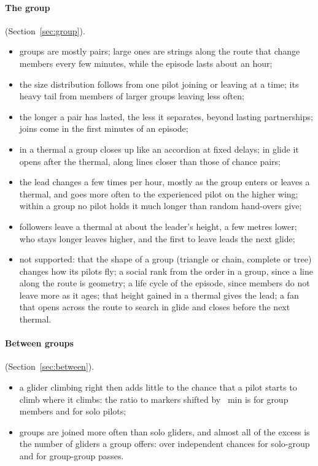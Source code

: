 \paragraph{The group} (Section~\ref{sec:group}).
\begin{itemize}
  \item groups are mostly pairs; large ones are strings along the route that change members every
        few minutes, while the episode lasts about an hour;
  \item the size distribution follows from one pilot joining or leaving at a time; its heavy tail
        from members of larger groups leaving less often;
  \item the longer a pair has lasted, the less it separates, beyond lasting partnerships; joins
        come in the first minutes of an episode;
  \item in a thermal a group closes up like an accordion at fixed delays; in glide it opens after
        the thermal, along lines closer than those of chance pairs;
  \item the lead changes a few times per hour, mostly as the group enters or leaves a thermal,
        and goes more often to the experienced pilot on the higher wing; within a group no pilot
        holds it much longer than random hand-overs give;
  \item followers leave a thermal at about the leader's height, a few metres lower; who stays
        longer leaves higher, and the first to leave leads the next glide;
  \item not supported: that the shape of a group (triangle or chain, complete or tree) changes how
        its pilots fly; a social rank from the order in a group, since a line along the route is
        geometry; a life cycle of the episode, since members do not leave more as it ages; that
        height gained in a thermal gives the lead; a fan that opens across the route to search in
        glide and closes before the next thermal.
\end{itemize}

\paragraph{Between groups} (Section~\ref{sec:between}).
\begin{itemize}
  \item a glider climbing right then adds little to the chance that a pilot starts to climb where
        it climbs: the ratio to markers shifted by \StMkNear~min is \StMkNowGroup{} for group
        members and \StMkNowSolo{} for solo pilots;
  \item groups are joined more often than solo gliders, and almost all of the excess is the number
        of gliders a group offers: over independent chances \StEnObsExpSoloGroup{} for solo-group and
        \StEnObsExpGroupGroup{} for group-group passes.
\end{itemize}

